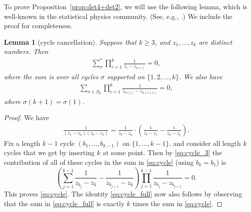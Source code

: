 \documentclass[pdftex]{sigma}
\numberwithin{equation}{section}
\newtheorem{Lemma}[Theorem]{Lemma}
\theoremstyle{definition}
\begin{document}
To prove Proposition~\ref{prop:det4+det2}, we will use the
 following lemma, which is well-known in the statistical physics community. (See, e.g., \cite[equation~(D.29)]{FGM_1995}.) We include the proof for completeness.
\begin{Lemma}[cycle cancellation]\label{lem:cycle}
Suppose that $k\ge 3$, and $z_1, \dots, z_k$ are distinct numbers. Then
\begin{align}\label{eq:cycle}
\sum^*_{\sigma} \prod_{i=1}^k \frac{1}{z_i-z_{\sigma(i)}}=0,
\end{align}
where the sum is over all cycles $\sigma$ supported on $\{1,2,\dots,k\}$. We also have
\begin{align}\label{eq:cycle_full}
 \sum_{\sigma\in S_k} \prod_{i=1}^k \frac{1}{z_{\sigma(i)}-z_{\sigma(i+1)}}=0,
\end{align}
where $\sigma(k+1)=\sigma(1)$.
\end{Lemma}
\begin{proof}
We have
\begin{align}\label{eq:cycle_3}
 \frac{1}{(z_1-z_a)(z_b-z_1)}=\frac{1}{z_b-z_a}\cdot \left(\frac{1}{z_b-z_1}-\frac{1}{z_a-z_1}\right).
\end{align}
Fix a length $k-1$ cycle $(b_1, \dots, b_{k-1})$ on $\{1,\dots, k-1\}$, and consider all length $k$ cycles that we get by inserting $k$ at some point. Then by \eqref{eq:cycle_3} the contribution of all of these cycles in the sum in \eqref{eq:cycle} (using $b_k=b_1$) is
\[
\left(\sum_{j=1}^{k-1} \frac{1}{z_{b_j}-z_k}-\frac{1}{z_{b_{j+1}}-z_k}\right) \prod_{j=1}^{k-1} \frac{1}{z_{b_j}-z_{b_{j+1}}}=0.
\]
This proves \eqref{eq:cycle}. The identity \eqref{eq:cycle_full} now also follows by observing that the sum in \eqref{eq:cycle_full} is exactly $k$ times the sum in \eqref{eq:cycle}.
\end{proof}
\end{document}

